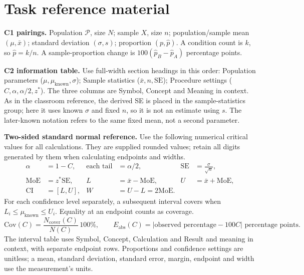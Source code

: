 \section*{Task reference material}
\textbf{C1 pairings.} Population $\mathcal P$, size $N$; sample $X$, size $n$; population/sample mean $(\mu,\bar x)$; standard deviation $(\sigma,s)$; proportion $(p,\hat p)$. A condition count is $k$, so $\hat p=k/n$. A sample-proportion change is $100(\hat p_B-\hat p_A)$ percentage points.

\textbf{C2 information table.} Use full-width section headings in this order: Population parameters ($\mu,\mu_{\mathrm{known}},\sigma$); Sample statistics ($\bar x,n,\mathrm{SE}$); Procedure settings ($C,\alpha,\alpha/2,z^*$). The three columns are Symbol, Concept and Meaning in context. As in the classroom reference, the derived SE is placed in the sample-statistics group; here it uses known $\sigma$ and fixed $n$, so it is not an estimate using $s$. The later-known notation refers to the same fixed mean, not a second parameter.

\textbf{Two-sided standard normal reference.} Use the following numerical critical values for all calculations. They are supplied rounded values; retain all digits generated by them when calculating endpoints and widths.
\[
\begin{aligned}
\alpha&=1-C,& \text{each tail}&=\alpha/2,&\mathrm{SE}&=\frac{\sigma}{\sqrt n},\\
\mathrm{MoE}&=z^*\mathrm{SE},&L&=\bar x-\mathrm{MoE},&U&=\bar x+\mathrm{MoE},\\
\mathrm{CI}&=[L,U],&W&=U-L=2\mathrm{MoE}.&&
\end{aligned}
\]
For each confidence level separately, a subsequent interval covers when
$L_i\leq\mu_{\mathrm{known}}\leq U_i$. Equality at an endpoint counts as coverage.
\[
\mathrm{Cov}(C)=\frac{N_{\mathrm{cover}}(C)}{N(C)}\,100\%,\qquad
E_{\mathrm{abs}}(C)=|\text{observed percentage}-100C|\text{ percentage points}.
\]
The interval table uses Symbol, Concept, Calculation and Result and meaning in context, with separate endpoint rows. Proportions and confidence settings are unitless; a mean, standard deviation, standard error, margin, endpoint and width use the measurement's units.

